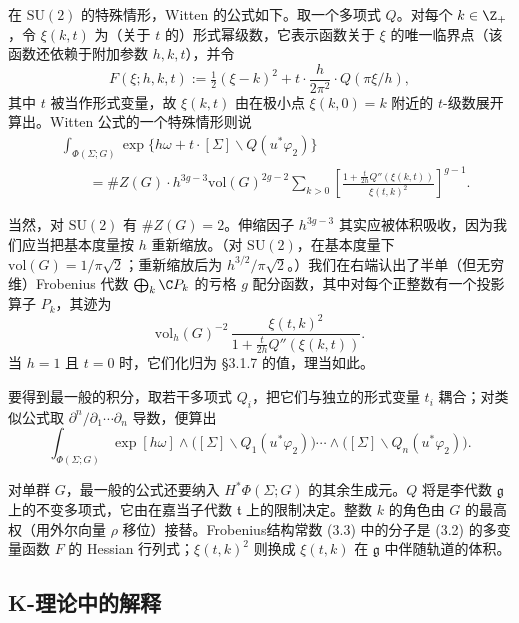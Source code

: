 在 $\mathrm{SU}(2)$ 的特殊情形，Witten 的公式如下。取一个多项式 $Q$。对每个 $k\in\Z_+$，令 $\xi(k,t)$ 为（关于 $t$ 的）形式幂级数，它表示函数关于 $\xi$ 的唯一临界点（该函数还依赖于附加参数 $h,k,t$），并令
\begin{equation}
F(\xi;h,k,t):=\tfrac12(\xi-k)^2+t\cdot\frac{h}{2\pi^2}\cdot Q(\pi\xi/h),
\tag{3.2}\label{eq:3.2}
\end{equation}
其中 $t$ 被当作形式变量，故 $\xi(k,t)$ 由在极小点 $\xi(k,0)=k$ 附近的 $t$-级数展开算出。Witten 公式的一个特殊情形则说
\[
\begin{aligned}
&\int_{\Phi(\Sigma;G)}\exp\bigl\{h\omega+t\cdot[\Sigma]\backslash Q(u^*\varphi_2)\bigr\}\\
&\qquad=\#Z(G)\cdot h^{3g-3}\mathrm{vol}(G)^{2g-2}
\sum_{k>0}\left[\frac{1+\frac{t}{2h}Q''(\xi(k,t))}{\xi(t,k)^2}\right]^{g-1}.
\end{aligned}
\]

当然，对 $\mathrm{SU}(2)$ 有 $\#Z(G)=2$。伸缩因子 $h^{3g-3}$ 其实应被体积吸收，因为我们应当把基本度量按 $h$ 重新缩放。（对 $\mathrm{SU}(2)$，在基本度量下 $\mathrm{vol}(G)=1/\pi\sqrt2$；重新缩放后为 $h^{3/2}/\pi\sqrt2$。）我们在右端认出了半单（但无穷维）Frobenius 代数 $\bigoplus_k\C P_k$ 的亏格 $g$ 配分函数，其中对每个正整数有一个投影算子 $P_k$，其迹为
\begin{equation}
\mathrm{vol}_h(G)^{-2}\,\frac{\xi(t,k)^2}{1+\tfrac{t}{2h}Q''(\xi(k,t))}.
\tag{3.3}\label{eq:3.3}
\end{equation}
当 $h=1$ 且 $t=0$ 时，它们化归为 §3.1.7 的值，理当如此。

要得到最一般的积分，取若干多项式 $Q_i$，把它们与独立的形式变量 $t_i$ 耦合；对类似公式取 $\partial^n/\partial_1\cdots\partial_n$ 导数，便算出
\[
\int_{\Phi(\Sigma;G)}\exp[h\omega]\wedge\bigl([\Sigma]\backslash Q_1(u^*\varphi_2)\bigr)\cdots\wedge\bigl([\Sigma]\backslash Q_n(u^*\varphi_2)\bigr).
\]

\begin{remark}
对单群 $G$，最一般的公式还要纳入 $H^*\Phi(\Sigma;G)$ 的其余生成元。$Q$ 将是李代数 $\mathfrak{g}$ 上的不变多项式，它由在嘉当子代数 $\mathfrak{t}$ 上的限制决定。整数 $k$ 的角色由 $G$ 的最高权（用外尔向量 $\rho$ 移位）接替。Frobenius结构常数 (3.3) 中的分子是 (3.2) 的多变量函数 $F$ 的 Hessian 行列式；$\xi(t,k)^2$ 则换成 $\xi(t,k)$ 在 $\mathfrak{g}$ 中伴随轨道的体积。
\end{remark}

\subsection{K-理论中的解释}


